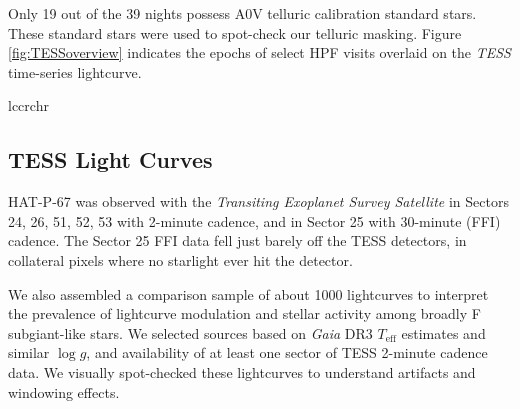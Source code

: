 \documentclass[twocolumn]{aastex631}
\begin{document}
Only 19 out of the 39 nights possess A0V telluric calibration standard stars.  These standard stars were used to spot-check our telluric masking.  Figure \ref{fig:TESSoverview} indicates the epochs of select HPF visits overlaid on the \emph{TESS} time-series lightcurve.


\begin{deluxetable}{lccrchr}
    \tablewidth{0pc}
    \tabletypesize{\scriptsize}
    \startdata
    
    \enddata
\end{deluxetable}

\subsection{TESS Light Curves}
HAT-P-67 was observed with the \emph{Transiting Exoplanet Survey Satellite} \citep[TESS,][]{2014SPIE.9143E..20R} in Sectors 24, 26, 51, 52, 53 with 2-minute cadence, and in Sector 25 with 30-minute (FFI) cadence.  The Sector 25 FFI data fell just barely off the TESS detectors, in collateral pixels where no starlight ever hit the detector.

We also assembled a comparison sample of about 1000 lightcurves to interpret the prevalence of lightcurve modulation and stellar activity among broadly F subgiant-like stars.  We selected sources based on \emph{Gaia} DR3 $T_\mathrm{eff}$ estimates and similar $\log{g}$,  and availability of at least one sector of TESS 2-minute cadence data.  We visually spot-checked these lightcurves to understand artifacts and windowing effects.
\end{document}
